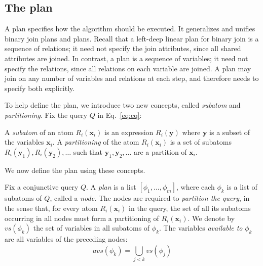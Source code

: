 \subsection{The \FJ plan}\label{sec:fj-plan}


A \FJ plan specifies how the \FJ algorithm should be executed.
It generalizes and unifies binary join plans and \GJ plans. 
Recall that a left-deep linear plan for binary join
  is a sequence of relations;
  it need not specify the join attributes, 
  since all shared attributes are joined.
In contrast, a \GJ plan is a sequence of variables;
  it need not specify the relations, 
  since all relations on each variable are joined.
A \FJ plan may join on any number of variables and relations at each step,
  and therefore needs to specify both explicitly.

  To help define the \FJ plan, we introduce two new concepts, called
  \emph{subatom} and \emph{partitioning}.  Fix the query $Q$ in
  Eq.~\eqref{eq:cq}:

\begin{defn}
  A \emph{subatom} of an atom $R_i(\bm x_i)$ is an expression
  $R_i(\bm y)$ where $\bm y$ is a subset of the variables $\bm x_i$.
  A \emph{partitioning} of the atom $R_i(\bm x_i)$ is a set of
  subatoms $R_i(\bm y_1), R_i(\bm y_2), \ldots$ such that
  $\bm y_1, \bm y_2, \ldots$ are a partition of $\bm x_i$.
\end{defn}

We now define the \FJ plan using these concepts.

\begin{defn}[\FJ Plan]
  Fix a conjunctive query $Q$.  A \FJ \emph{plan} is a list
  $[\phi_1, \ldots, \phi_m]$, where each $\phi_k$ is a list of
  subatoms of $Q$, called a {\em node}.  The nodes are required to
  {\em partition the query}, in the sense that, for every atom
  $R_i(\bm x_i)$ in the query, the set of all its subatoms occurring
  in all nodes must form a partitioning of $R_i(\bm x_i)$.  We denote
  by $vs(\phi_k)$ the set of variables in all subatoms of $\phi_k$.
  The variables \emph{available to} $\phi_k$ are all variables of the
  preceding nodes:
%
$$avs(\phi_k) = \bigcup_{j < k} vs(\phi_j)$$
%
\end{defn}


